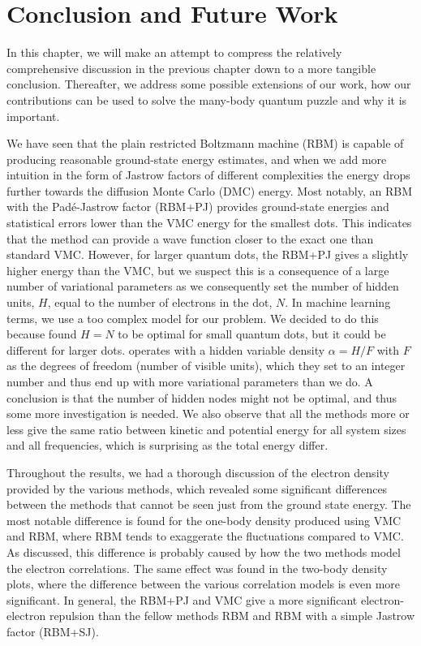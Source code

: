 \chapter{Conclusion and Future Work} \label{sec:conclusion}
In this chapter, we will make an attempt to compress the relatively comprehensive discussion in the previous chapter down to a more tangible conclusion. Thereafter, we address some possible extensions of our work, how our contributions can be used to solve the many-body quantum puzzle and why it is important. 

We have seen that the plain restricted Boltzmann machine (RBM) is capable of producing reasonable ground-state energy estimates, and when we add more intuition in the form of Jastrow factors of different complexities the energy drops further towards the diffusion Monte Carlo (DMC) energy. Most notably, an RBM with the Padé-Jastrow  factor (RBM+PJ) provides ground-state energies and statistical errors lower than the VMC energy for the smallest dots. This indicates that the method can provide a wave function closer to the exact one than standard VMC. However, for larger quantum dots, the RBM+PJ gives a slightly higher energy than the VMC, but we suspect this is a consequence of a large number of variational parameters as we consequently set the number of hidden units, $H$, equal to the number of electrons in the dot, $N$. In machine learning terms, we use a too complex model for our problem. We decided to do this because \citet{nordhagen_computational_2018} found $H=N$ to be optimal for small quantum dots, but it could be different for larger dots. \citet{carleo_solving_2017} operates with a hidden variable density $\alpha=H/F$ with $F$ as the degrees of freedom (number of visible units), which they set to an integer number and thus end up with more variational parameters than we do. A conclusion is that the number of hidden nodes might not be optimal, and thus some more investigation is needed. We also observe that all the methods more or less give the same ratio between kinetic and potential energy for all system sizes and all frequencies, which is surprising as the total energy differ.

Throughout the results, we had a thorough discussion of the electron density provided by the various methods, which revealed some significant differences between the methods that cannot be seen just from the ground state energy. The most notable difference is found for the one-body density produced using VMC and RBM, where RBM tends to exaggerate the fluctuations compared to VMC. As discussed, this difference is probably caused by how the two methods model the electron correlations. The same effect was found in the two-body density plots, where the difference between the various correlation models is even more significant. In general, the RBM+PJ and VMC give a more significant electron-electron repulsion than the fellow methods RBM and RBM with a simple Jastrow factor (RBM+SJ).

